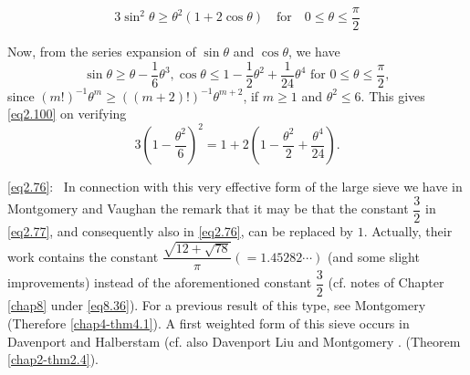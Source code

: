 \begin{equation*}
3 \sin^2 \theta \geq \theta^2 (1+2 \cos \theta) \quad \text{for} \quad  0 \leq
\theta \leq \frac{\pi}{2}  \tag{2.100}\label{eq2.100} 
\end{equation*}

Now, from the series expansion of $\sin \theta$ and $\cos \theta$, we have
\begin{equation*}
\sin \theta \geq \theta -\frac{1}{6}\theta^3 , \cos \theta \leq 1-
\frac{1}{2} \theta^2+ \frac{1}{24} \theta^4 \text{ for } 0 \leq \theta
\leq \frac{\pi}{2}, \tag{2.101} \label{eq2.101}
\end{equation*}
since $(m!)^{-1} \theta^m \geq ((m+2)!)^{-1} \theta^{m+2}$, if $m \geq 1$ and $\theta^2 \leq 6$. This gives \eqref{eq2.100} on verifying
\begin{equation*}
3(1-\frac{\theta^2}{6})^2 = 1+2(1-\frac{\theta^2}{2}
+\frac{\theta^4}{24}). \tag{2.102} \label{eq2.102}
\end{equation*}

\eqref{eq2.76}:~ In connection with this very effective form of the
large sieve we have in Montgomery and Vaughan \cite{key2} the remark
that it may be that the constant $\dfrac{3}{2}$ in \eqref{eq2.77}, and
consequently also in \eqref{eq2.76}, can be replaced by $1$. Actually,
their work contains the constant $\dfrac{\sqrt{12
    +\sqrt{78}}}{\pi}(=1.45282 \cdots)$ (and some slight improvements)
instead of the aforementioned constant $\dfrac{3}{2}$ (cf. notes of
Chapter \ref{chap8} under \eqref{eq8.36}). For a previous result of
this type, see Montgomery \cite{key5} (Therefore
\ref{chap4-thm4.1}). A first weighted form of this sieve occurs in
Davenport and Halberstam \cite{key1} (cf. also Davenport \cite{key1}
Liu \cite{key1} and Montgomery \cite{key5}. (Theorem
\ref{chap2-thm2.4}). 

